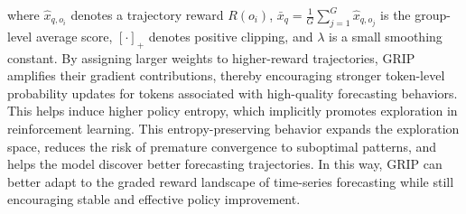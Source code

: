 where $\hat{x}_{q,o_i}$ denotes a trajectory reward $R(o_i)$, $\bar{x}_q=\frac{1}{G}\sum_{j=1}^{G}\hat{x}_{q,o_j}$ is the group-level average score, $[\cdot]_+$ denotes positive clipping, and $\lambda$ is a small smoothing constant. By assigning larger weights to higher-reward trajectories, GRIP amplifies their gradient contributions, thereby encouraging stronger token-level probability updates for tokens associated with high-quality forecasting behaviors. This helps induce higher policy entropy, which implicitly promotes exploration in reinforcement learning. This entropy-preserving behavior expands the exploration space, reduces the risk of premature convergence to suboptimal patterns, and helps the model discover better forecasting trajectories. In this way, GRIP can better adapt to the graded reward landscape of time-series forecasting while still encouraging stable and effective policy improvement.






% 


